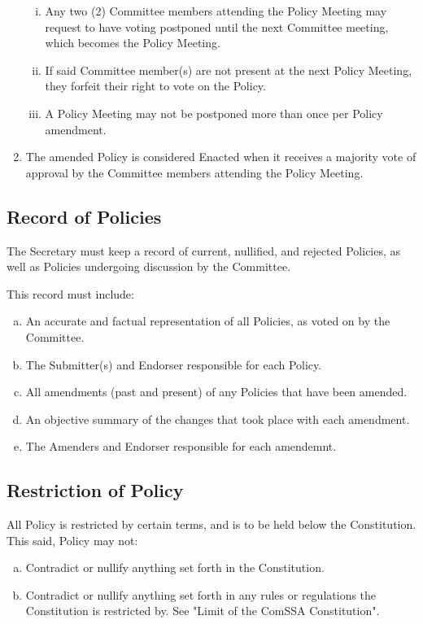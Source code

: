 \documentclass[a4paper,12pt]{article}
\begin{document}
\begin{enumerate}[1)]
    \begin{enumerate}[i)]
        \item Any two (2) Committee members attending the Policy Meeting may request to have voting postponed until the next Committee meeting, which becomes the Policy Meeting.
        \item If said Committee member(s) are not present at the next Policy Meeting, they forfeit their right to vote on the Policy.
        \item A Policy Meeting may not be postponed more than once per Policy amendment.
    \end{enumerate}
    \item The amended Policy is considered Enacted when it receives a majority vote of approval by the Committee members attending the Policy Meeting.
\end{enumerate}

\subsection{Record of Policies}
The Secretary must keep a record of current, nullified, and rejected Policies, as well as Policies undergoing discussion by the Committee.

This record must include:
\begin{enumerate}[a)]
    \item An accurate and factual representation of all Policies, as voted on by the Committee.
    \item The Submitter(s) and Endorser responsible for each Policy.
    \item All amendments (past and present) of any Policies that have been amended.
    \item An objective summary of the changes that took place with each amendment.
    \item The Amenders and Endorser responsible for each amendemnt.
\end{enumerate}

\subsection{Restriction of Policy}

All Policy is restricted by certain terms, and is to be held below the Constitution. This said, Policy may not:

\begin{enumerate}[a)]
    \item Contradict or nullify anything set forth in the Constitution.
    \item Contradict or nullify anything set forth in any rules or regulations the Constitution is restricted by. See "Limit of the ComSSA Constitution".
\end{enumerate}
\end{document}
